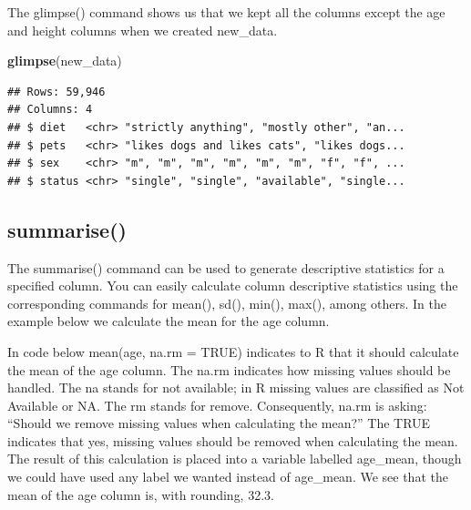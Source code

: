 \documentclass[
]{krantz}
\makeatletter
\newenvironment{Shaded}{\begin{snugshade}}{\end{snugshade}}
\newcommand{\DataTypeTok}[1]{\textcolor[rgb]{0.27,0.27,0.27}{#1}}
\newcommand{\KeywordTok}[1]{\textcolor[rgb]{0.27,0.27,0.27}{\textbf{#1}}}
\newcommand{\NormalTok}[1]{#1}
\newcommand{\OperatorTok}[1]{\textcolor[rgb]{0.43,0.43,0.43}{\textbf{#1}}}
\newcommand{\OtherTok}[1]{\textcolor[rgb]{0.37,0.37,0.37}{#1}}
\newcommand{\StringTok}[1]{\textcolor[rgb]{0.5,0.5,0.5}{#1}}
\newenvironment{kframe}{%
\medskip{}
\setlength{\fboxsep}{.8em}
 \def\at@end@of@kframe{}%
 \ifinner\ifhmode%
  \def\at@end@of@kframe{\end{minipage}}%
  \begin{minipage}{\columnwidth}%
 \fi\fi%
 \def\FrameCommand##1{\hskip\@totalleftmargin \hskip-\fboxsep
 \colorbox{shadecolor}{##1}\hskip-\fboxsep
     \hskip-\linewidth \hskip-\@totalleftmargin \hskip\columnwidth}%
 \MakeFramed {\advance\hsize-\width
   \@totalleftmargin\z@ \linewidth\hsize
   \@setminipage}}%
 {\par\unskip\endMakeFramed%
 \at@end@of@kframe}
\renewenvironment{Shaded}{\begin{kframe}}{\end{kframe}}
\makeatother
\begin{document}
The glimpse() command shows us that we kept all the columns except the age and height columns when we created new\_data.

\begin{Shaded}
\begin{Highlighting}[]
\KeywordTok{glimpse}\NormalTok{(new_data)}
\end{Highlighting}
\end{Shaded}

\begin{verbatim}
## Rows: 59,946
## Columns: 4
## $ diet   <chr> "strictly anything", "mostly other", "an...
## $ pets   <chr> "likes dogs and likes cats", "likes dogs...
## $ sex    <chr> "m", "m", "m", "m", "m", "m", "f", "f", ...
## $ status <chr> "single", "single", "available", "single...
\end{verbatim}

\hypertarget{summarise}{%
\subsection{summarise()}\label{summarise}}

The summarise() command can be used to generate descriptive statistics for a specified column. You can easily calculate column descriptive statistics using the corresponding commands for mean(), sd(), min(), max(), among others. In the example below we calculate the mean for the age column.

In code below mean(age, na.rm = TRUE) indicates to R that it should calculate the mean of the age column. The na.rm indicates how missing values should be handled. The na stands for not available; in R missing values are classified as Not Available or NA. The rm stands for remove. Consequently, na.rm is asking: ``Should we remove missing values when calculating the mean?'' The TRUE indicates that yes, missing values should be removed when calculating the mean. The result of this calculation is placed into a variable labelled age\_mean, though we could have used any label we wanted instead of age\_mean. We see that the mean of the age column is, with rounding, 32.3.

\begin{Shaded}
\end{Shaded}
\end{document}
